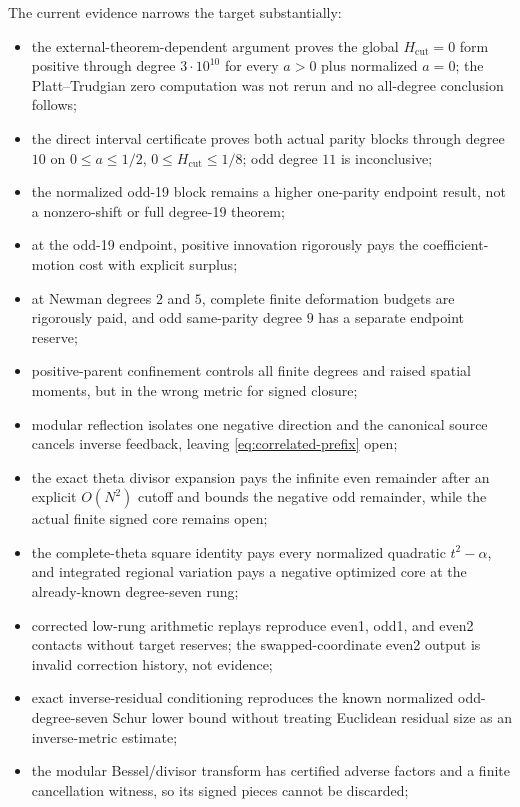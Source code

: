 \documentclass[11pt]{article}
\theoremstyle{definition}
\theoremstyle{remark}
\begin{document}
The current evidence narrows the target substantially:
\begin{itemize}
\item the external-theorem-dependent argument proves the global
  $H_{\mathrm{cut}}=0$ form positive through degree $3\cdot10^{10}$ for every
  $a>0$ plus normalized $a=0$; the Platt--Trudgian zero computation was not
  rerun and no all-degree conclusion follows;
\item the direct interval certificate proves both actual parity blocks through
  degree $10$ on $0\le a\le1/2$,
  $0\le H_{\mathrm{cut}}\le1/8$; odd degree $11$ is inconclusive;
\item the normalized odd-19 block remains a higher one-parity endpoint result,
  not a nonzero-shift or full degree-19 theorem;
\item at the odd-19 endpoint, positive innovation rigorously pays the
  coefficient-motion cost with explicit surplus;
\item at Newman degrees $2$ and $5$, complete finite deformation budgets are
  rigorously paid, and odd same-parity degree $9$ has a separate endpoint
  reserve;
\item positive-parent confinement controls all finite degrees and raised
  spatial moments, but in the wrong metric for signed closure;
\item modular reflection isolates one negative direction and the canonical
  source cancels inverse feedback, leaving \eqref{eq:correlated-prefix} open;
\item the exact theta divisor expansion pays the infinite even remainder after
  an explicit $O(N^2)$ cutoff and bounds the negative odd remainder, while the
  actual finite signed core remains open;
\item the complete-theta square identity pays every normalized quadratic
  $t^2-\alpha$, and integrated regional variation pays a negative optimized
  core at the already-known degree-seven rung;
\item corrected low-rung arithmetic replays reproduce even1, odd1, and even2
  contacts without target reserves; the swapped-coordinate even2 output is
  invalid correction history, not evidence;
\item exact inverse-residual conditioning reproduces the known normalized
  odd-degree-seven Schur lower bound without treating Euclidean residual size
  as an inverse-metric estimate;
\item the modular Bessel/divisor transform has certified adverse factors and a
  finite cancellation witness, so its signed pieces cannot be discarded;

\end{itemize}
\end{document}
